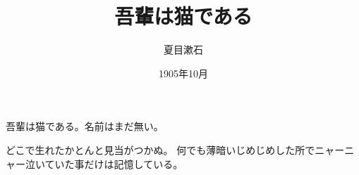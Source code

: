 \documentclass{article}
\title{吾輩は猫である}
\author{夏目漱石}
\date{1905年10月}
\begin{document}
吾輩は猫である。名前はまだ無い。

どこで生れたかとんと見当がつかぬ。
何でも薄暗いじめじめした所でニャーニャー泣いていた事だけは記憶している。
\end{document}
